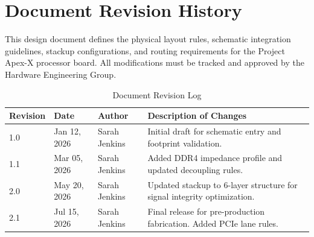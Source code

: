 \section{Document Revision History}
This design document defines the physical layout rules, schematic integration guidelines, stackup configurations, and routing requirements for the Project Apex-X processor board. All modifications must be tracked and approved by the Hardware Engineering Group.

\vspace{0.2cm}
\begin{table}[h]
\centering
\fontsize{9}{11}\selectfont
\begin{tabularx}{\textwidth}{l l p{3cm} X}
\rowcolor{primary}
\color{white}\textbf{Revision} & \color{white}\textbf{Date} & \color{white}\textbf{Author} & \color{white}\textbf{Description of Changes} \\
\midrule
1.0 & Jan 12, 2026 & Sarah Jenkins & Initial draft for schematic entry and footprint validation. \\
\rowcolor{lightbg}
1.1 & Mar 05, 2026 & Sarah Jenkins & Added DDR4 impedance profile and updated decoupling rules. \\
2.0 & May 20, 2026 & Sarah Jenkins & Updated stackup to 6-layer structure for signal integrity optimization. \\
\rowcolor{lightbg}
2.1 & Jul 15, 2026 & Sarah Jenkins & Final release for pre-production fabrication. Added PCIe lane rules. \\
\bottomrule
\end{tabularx}
\caption{Document Revision Log}
\label{tab:revision}
\end{table}

